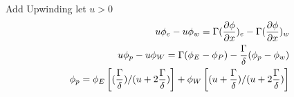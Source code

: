 \documentclass{article}
\begin{document}
Add Upwinding
let $u>0$
\begin{align}
  u\phi_e - u\phi_w = \Gamma (\frac{\partial \phi}{\partial x})_e - \Gamma(\frac{\partial \phi}{\partial x})_w\\
  u\phi_p - u\phi_W = \Gamma(\phi_E - \phi_P) - \frac{\Gamma}{\delta}(\phi_p-\phi_w)\\
  \phi_p = \phi_E\left[(\frac{\Gamma}{\delta})/(u + 2 \frac{\Gamma}{\delta})\right] + \phi_W\left[(u+\frac{\Gamma}{\delta})/(u + 2 \frac{\Gamma}{\delta})\right] 
  \label{Upwinding}
\end{align}
\end{document}
